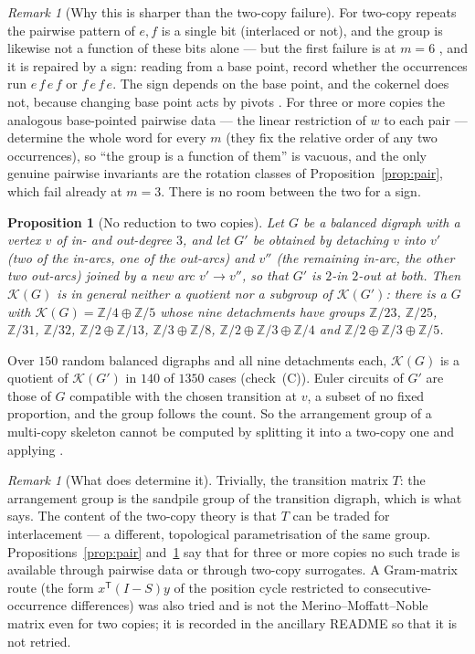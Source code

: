 \documentclass[11pt]{article}
\theoremstyle{plain}
\newtheorem{proposition}[theorem]{Proposition}
\theoremstyle{definition}
\theoremstyle{remark}
\newtheorem{remark}[theorem]{Remark}
\newcommand{\Z}{\mathbb{Z}}
\newcommand{\K}{\mathcal{K}}
\begin{document}
\begin{remark}[Why this is sharper than the two-copy failure]\label{rem:sharper}
For two-copy repeats the pairwise pattern of $e,f$ is a single bit (interlaced or not),
and the group is likewise not a function of these bits alone --- but the first failure
is at $m=6$ \cite[Rem.~6.7]{MMN}, and it is repaired by a sign: reading from a base
point, record whether the occurrences run $e\,f\,e\,f$ or $f\,e\,f\,e$. The sign depends
on the base point, and the cokernel does not, because changing base point acts by
pivots \cite[Lem.~4.8]{MMN}. For three or more copies the analogous base-pointed pairwise
data --- the linear restriction of $w$ to each pair --- determine the whole word for
every $m$ (they fix the relative order of any two occurrences), so ``the group is a
function of them'' is vacuous, and the only genuine pairwise invariants are the rotation
classes of Proposition~\ref{prop:pair}, which fail already at $m=3$. There is no room
between the two for a sign.
\end{remark}

\begin{proposition}[No reduction to two copies]\label{prop:detach}
Let $G$ be a balanced digraph with a vertex $v$ of in- and out-degree $3$, and let $G'$
be obtained by detaching $v$ into $v'$ (two of the in-arcs, one of the out-arcs) and
$v''$ (the remaining in-arc, the other two out-arcs) joined by a new arc $v'\to v''$, so
that $G'$ is $2$-in $2$-out at both. Then $\K(G)$ is in general neither a quotient nor a
subgroup of $\K(G')$: there is a $G$ with $\K(G)=\Z/4\oplus\Z/5$ whose nine detachments
have groups $\Z/23$, $\Z/25$, $\Z/31$, $\Z/32$, $\Z/2\oplus\Z/13$, $\Z/3\oplus\Z/8$,
$\Z/2\oplus\Z/3\oplus\Z/4$ and $\Z/2\oplus\Z/3\oplus\Z/5$.
\end{proposition}

Over $150$ random balanced digraphs and all nine detachments each, $\K(G)$ is a quotient
of $\K(G')$ in $140$ of $1350$ cases (check~(C)). Euler circuits of $G'$ are those of $G$
compatible with the chosen transition at $v$, a subset of no fixed proportion, and the
group follows the count. So the arrangement group of a multi-copy skeleton cannot be
computed by splitting it into a two-copy one and applying \cite{MMN}.

\begin{remark}[What does determine it]
Trivially, the transition matrix $T$: the arrangement group is the sandpile group of the
transition digraph, which is what \cite{Bio3} says. The content of the two-copy theory is
that $T$ can be traded for interlacement --- a different, topological parametrisation of
the same group. Propositions~\ref{prop:pair} and~\ref{prop:detach} say that for three or
more copies no such trade is available through pairwise data or through two-copy
surrogates. A Gram-matrix route (the form $x^{\mathsf T}(I-S)y$ of the position cycle
restricted to consecutive-occurrence differences) was also tried and is not the
Merino--Moffatt--Noble matrix even for two copies; it is recorded in the ancillary
README so that it is not retried.
\end{remark}
\end{document}
